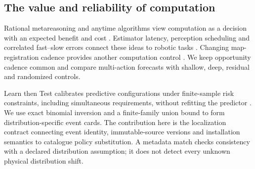 \subsection{The value and reliability of computation}
Rational metareasoning and anytime algorithms view computation as a decision with an expected benefit and cost \cite{russell1991meta,zilberstein1996anytime,hay2012,callaway2018}. Estimator latency, perception scheduling and correlated fast--slow errors connect these ideas to robotic tasks \cite{pant2021,aldana2023,ghosh2021}. Changing map-registration cadence provides another computation control \cite{papais2026}. We keep opportunity cadence common and compare multi-action forecasts with shallow, deep, residual and randomized controls.

Learn then Test calibrates predictive configurations under finite-sample risk constraints, including simultaneous requirements, without refitting the predictor \cite{angelopoulos2025ltt}. We use exact binomial inversion \cite{clopper1934} and a finite-family union bound to form distribution-specific event cards. The contribution here is the localization contract connecting event identity, immutable-source versions and installation semantics to catalogue policy substitution. A metadata match checks consistency with a declared distribution assumption; it does not detect every unknown physical distribution shift.
